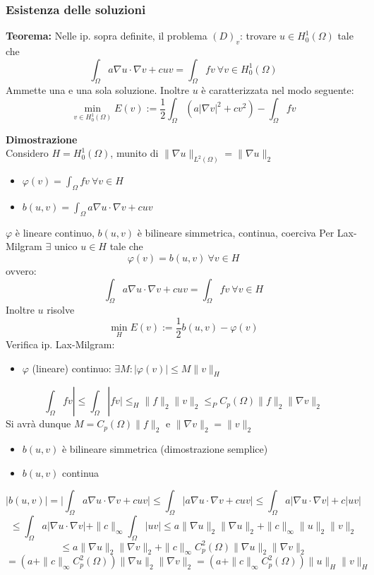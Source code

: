 \subsubsection{Esistenza delle soluzioni}
\begin{tcolorbox}
	\textbf{Teorema: }Nelle ip. sopra definite, il problema $(D)_v$: trovare $u\in H_0^1(\Omega)$ tale che
	\[\int_{\Omega}^{} a\nabla u\cdot \nabla v+cuv=\int_{\Omega}^{} fv\ \forall v\in H_0^1(\Omega)\]
	Ammette una e una sola soluzione. Inoltre $u$ è caratterizzata nel modo seguente:
	\[\min_{v\in H_0^1(\Omega)}E(v):=\frac{1}{2}\int_{\Omega}^{} (a|\nabla v|^2+cv^2)-\int_{\Omega}^{} fv\]

\end{tcolorbox}
\textbf{Dimostrazione} 
\\Considero $H=H^1_0(\Omega)$, munito di $\|\nabla u\|_{L^{2}(\Omega)}=\|\nabla u\|_2$
\begin{itemize}
	\item $\varphi(v)=\int_{\Omega}^{} fv\ \forall v\in H $ 
	\item $b(u,v)=\int_{\Omega}^{} a\nabla u\cdot \nabla v+cuv $ 

\end{itemize}
$\varphi$ è lineare continuo, $b(u,v)$ è bilineare simmetrica, continua, coerciva
Per Lax-Milgram $\exists $ unico $u\in H$ tale che 
\[\varphi(v)=b(u,v)\ \forall v\in H\]
ovvero:
\[\int_{\Omega}^{} a\nabla u\cdot \nabla v +cuv=\int_{\Omega}^{}fv \ \forall v\in H\]
Inoltre $u$ risolve
\[\min_{H}E(v):=\frac{1}{2}b(u,v)-\varphi(v)\]
Verifica ip. Lax-Milgram:
\begin{itemize}
	\item $\varphi$ (lineare) continuo: $\exists M:|\varphi(v)|\le M\|v\|_H$
\end{itemize}
\[\int_{\Omega}^{} fv|\le \int_{\Omega}^{} |fv|\le_H\|f\|_2\|v\|_2\le_PC_p(\Omega)\|f\|_2\|\nabla v\|_2\]
Si avrà dunque $M=C_p(\Omega)\|f\|_2$ e $\|\nabla v\|_2=\|v\|_2$
\begin{itemize}
	\item $b(u,v)$ è bilineare simmetrica (dimostrazione semplice)
\end{itemize}
\begin{itemize}
	\item $b(u,v)$ continua

\end{itemize}
\[|b(u,v)|=\bigg|\int_{\Omega}^{} a\nabla u\cdot \nabla v+cuv\bigg|\le \int_{\Omega}^{} |a\nabla u\cdot \nabla v+cuv|\le \int_{\Omega}^{} a|\nabla u\cdot \nabla v|+c|uv| \]
\[\le \int_{\Omega}^{} a|\nabla u\cdot \nabla v|+\|c\|_{\infty}\int_{\Omega}^{} |uv|   \le a \|\nabla u\|_2 \|\nabla u\|_2+\|c\|_\infty\|u\|_2\|v\|_2\]
\[\le a \|\nabla u\|_2\|\nabla v\|_2+\|c\|_\infty C_p^2(\Omega)\|\nabla u\|_2\|\nabla v\|_2\]
\[=(a+\|c\|_\infty C^2_p(\Omega))\|\nabla u\|_2\|\nabla v\|_2=(a+\|c\|_\infty C^2_p(\Omega))\|u\|_H\|v\|_H\]

